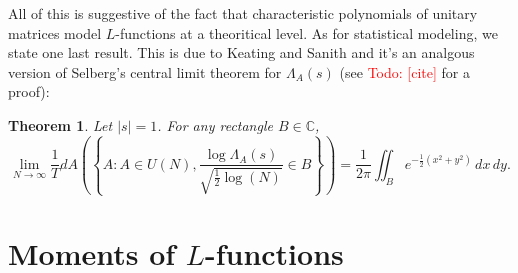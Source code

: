 \documentclass[12pt]{book}
\newtheorem{theorem}{Theorem}[section]
\theoremstyle{definition}\newframedtheorem{method}{Method}
\newcommand{\C}{\mathbb{C}}
\renewcommand{\L}{\Lambda}
\newcommand{\<}{\langle}
\renewcommand{\>}{\rangle}
\newcommand{\todo}[1]{\textcolor{red}{\sf Todo: [#1]}}
\begin{document}
      All of this is suggestive of the fact that characteristic polynomials of unitary matrices model $L$-functions at a theoritical level. As for statistical modeling, we state one last result. This is due to Keating and Sanith and it's an analgous version of Selberg's central limit theorem for $\L_{A}(s)$ (see \todo{cite} for a proof):

      \begin{theorem}
        Let $|s| = 1$. For any rectangle $B \in \C$,
        \[
          \lim_{N \to \infty}\frac{1}{T}dA\left(\left\{A:A \in U(N),\frac{\log\L_{A}(s)}{\sqrt{\frac{1}{2}\log(N)}} \in B\right\}\right) = \frac{1}{2\pi}\iint_{B}e^{-\frac{1}{2}(x^{2}+y^{2})}\,dx\,dy.
        \]
      \end{theorem}
  \section{Moments of \texorpdfstring{$L$}{L}-functions}
\appendix
\printindex


\end{document}
